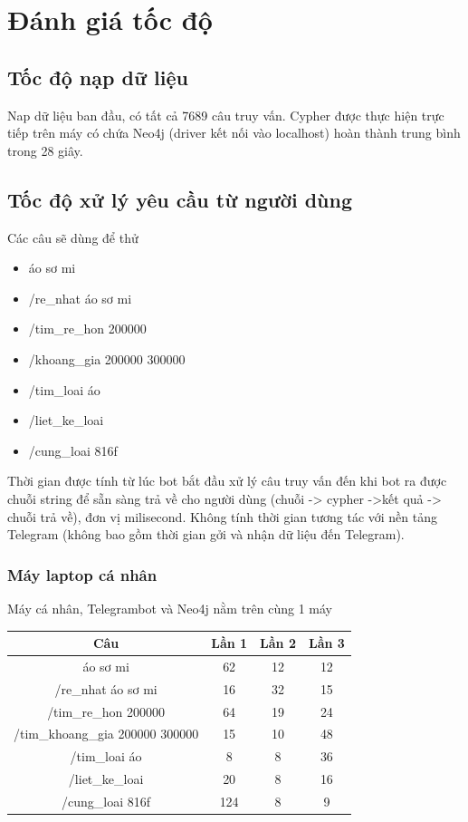 \section{Đánh giá tốc độ} 

\subsection{Tốc độ nạp dữ liệu}

Nap dữ liệu ban đầu, có tất cả 7689 câu truy vấn. Cypher được thực hiện trực tiếp trên máy có chứa Neo4j (driver kết nối vào localhost) hoàn thành trung bình trong 28 giây. 


\subsection{Tốc độ xử lý yêu cầu từ người dùng}

Các câu sẽ dùng để thử 

\begin{itemize}
\item áo sơ mi
\item /re\_nhat áo sơ mi
\item /tim\_re\_hon 200000
\item /khoang\_gia 200000 300000
\item /tim\_loai áo
\item /liet\_ke\_loai
\item /cung\_loai 816f
\end{itemize}

Thời gian được tính từ lúc bot bắt đầu xử lý câu truy vấn đến khi bot ra được chuỗi string để sẵn sàng trả về cho người dùng (chuỗi -> cypher ->kết quả -> chuỗi trả về), đơn vị milisecond. Không tính thời gian tương tác với nền tảng Telegram (không bao gồm thời gian gởi và nhận dữ liệu đến Telegram). 

\subsubsection{Máy laptop cá nhân}
Máy cá nhân, Telegrambot và Neo4j nằm trên cùng 1 máy 

\begin{center}
 \begin{tabular}{||c c c c||} 
 \hline
Câu & Lần 1 & Lần 2 & Lần 3 \\ [0.5ex] 
 \hline
 \hline
áo sơ mi  & 62 & 12 & 12 \\ 
 \hline
/re\_nhat áo sơ mi & 16 & 32 & 15 \\
 \hline
 /tim\_re\_hon 200000 & 64 & 19 & 24 \\
 \hline
 /tim\_khoang\_gia 200000 300000 & 15 & 10 & 48 \\
 \hline
 /tim\_loai áo & 8 & 8 & 36 \\
 \hline
/liet\_ke\_loai & 20 & 8 & 16 \\
 \hline
  /cung\_loai 816f & 124 & 8  & 9 \\ [1ex] 
 \hline
\end{tabular}
\end{center}


